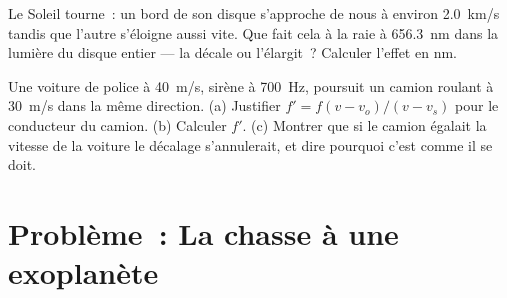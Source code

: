 \begin{exercise}[$\star\star\star$]\label{exo:g12:doppler-effect:14}
Le Soleil tourne~: un bord de son disque s'approche de nous à environ
\qty{2.0}{km/s} tandis que l'autre s'éloigne aussi vite. Que fait cela
à la raie à \qty{656.3}{nm} dans la lumière du disque entier --- la
décale ou l'élargit~? Calculer l'effet en \unit{nm}.
\end{exercise}

\begin{exercise}[$\star\star\star$]\label{exo:g12:doppler-effect:15}
Une voiture de police à \qty{40}{m/s}, sirène à \qty{700}{Hz}, poursuit
un camion roulant à \qty{30}{m/s} dans la même direction. (a) Justifier
$f' = f(v - v_o)/(v - v_s)$ pour le conducteur du camion. (b) Calculer
$f'$. (c) Montrer que si le camion égalait la vitesse de la voiture le
décalage s'annulerait, et dire pourquoi c'est comme il se doit.
\end{exercise}

\section{Problème~: La chasse à une exoplanète}

